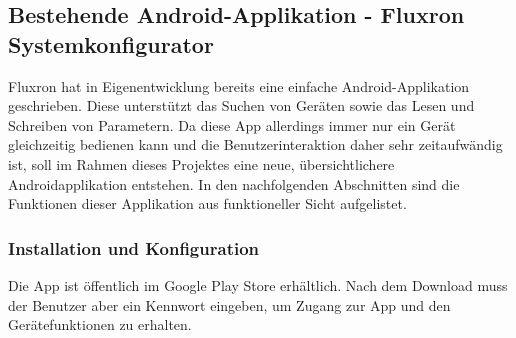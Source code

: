 \subsection{Bestehende Android-Applikation - Fluxron Systemkonfigurator }
\label{subsec:Bestehende Smartphone-Applikation}
Fluxron hat in Eigenentwicklung bereits eine einfache Android-Applikation geschrieben. Diese unterstützt das Suchen von Geräten sowie das Lesen und Schreiben von Parametern. Da diese App allerdings immer nur ein Gerät gleichzeitig bedienen kann und die Benutzerinteraktion daher sehr zeitaufwändig ist, soll im Rahmen dieses Projektes eine neue, übersichtlichere Androidapplikation entstehen. In den nachfolgenden Abschnitten sind die Funktionen dieser Applikation aus funktioneller Sicht aufgelistet.

\subsubsection{Installation und Konfiguration}
\label{subsubsec:Installation und Konfiguration}
Die App ist öffentlich im Google Play Store erhältlich. Nach dem Download muss der Benutzer aber ein Kennwort eingeben, um Zugang zur App und den Gerätefunktionen zu erhalten.


